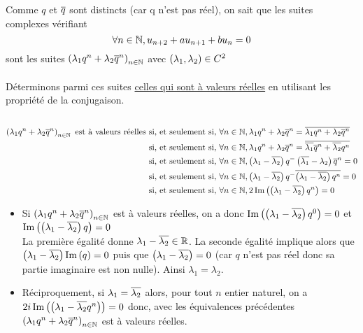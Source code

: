 \begin{dem}
\begin{itemize}
        Comme \(q\) et \(\overline{q}\) sont distincts (car q n'est pas réel), on sait que les suites complexes vérifiant 
        \[\forall n \in \mathbb{N},u_{n+2} + au_{n+1}+bu_n = 0\]
        sont les suites \(\left(\lambda_1 q^n + \lambda_2\overline{q}^n\right)_{n \in \mathbb{N}}\) avec \(\left(\lambda_1,\lambda_2\right)\in C^2\) \\~\\
        Déterminons parmi ces suites \underline{celles qui sont à valeurs réelles} en utilisant les propriété de la conjugaison. \\~\\
        \begin{align*}
        \left(\lambda_1q^n + \lambda_2 \overline{q}^n\right)_{n \in \mathbb{N}} \text{ est à valeurs réelles } &\text{si, et seulement si, } \forall n \in \mathbb{N},\lambda_1 q^n + \lambda_2 \overline{q}^n =\overline{\lambda_1 q^n + \lambda_2 \overline{q}^n} \\
        &\text{si, et seulement si, } \forall n \in \mathbb{N},\lambda_1 q^n + \lambda_2 \overline{q}^n =\overline{\overline{\lambda_1} \overline{q}^n + \overline{\lambda_2} q^n}\\
        &\text{si, et seulement si, } \forall n \in \mathbb{N},\left(\lambda_1 -\overline{\lambda_2}\right)q^ - \left(\overline{\lambda_1}-\lambda_2\right)\overline{q}^n = 0 \\
        &\text{si, et seulement si, } \forall n \in \mathbb{N},\left(\lambda_1 -\overline{\lambda_2}\right)q^ - \overline{\left(\lambda_1-\overline{\lambda_2}\right)q^n} = 0 \\
        &\text{si, et seulement si, } \forall n \in \mathbb{N},2 \operatorname{Im}\left(\left(\lambda_1-\overline{\lambda_2}\right)q^n\right) = 0 
        \end{align*}
        \begin{itemize}
            \item Si \(\left(\lambda_1 q^n + \lambda_2\overline{q}^n\right)_{n \in \mathbb{N}}\)  est à valeurs réelles, on a donc \(\operatorname{Im}\left(\left(\lambda_1-\overline{\lambda_2}\right)q^0\right) = 0 \) et \(\operatorname{Im}\left(\left(\lambda_1-\overline{\lambda_2}\right)q\right) = 0 \)\\
            La première égalité donne \(\lambda_1 - \overline{\lambda_2} \in \mathbb{R}\). La seconde égalité implique alors que \(\left(\lambda_1-\overline{\lambda_2}\right)\operatorname{Im}\left(q\right) =0\) puis que \(\left(\lambda_1-\overline{\lambda_2}\right) = 0\) (car \(q\) n'est pas réel donc sa partie imaginaire est non nulle). Ainsi \(\lambda_1 = \lambda_2\).
            \item Réciproquement, si \(\lambda_1 = \overline{\lambda_2}\) alors, pour tout \(n\) entier naturel, on a \(2i \operatorname{Im}\left(\left(\lambda_1-\overline{\lambda_2}q^n\right)\right) = 0\) donc, avec les équivalences précédentes \(\left(\lambda_1q^n + \lambda_2 \overline{q}^n\right)_{n \in \mathbb{N}}\) est à valeurs réelles. 

\end{itemize}
\end{itemize}
\end{dem}
